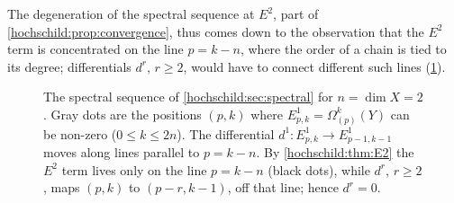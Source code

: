 The degeneration of the spectral sequence at $E^2$, part of
\cref{hochschild:prop:convergence}, thus comes down to the observation that
the $E^2$ term is concentrated on the line $p=k-n$, where the order of a
chain is tied to its degree; differentials $d^r$, $r\ge2$, would have to
connect different such lines (\cref{hochschild:fig:E2}).

\begin{figure}[htbp]
\centering
{}
\caption[The spectral sequence for the symbol algebra]{The spectral
sequence of \cref{hochschild:sec:spectral} for $n=\dim X=2$. Gray dots are
the positions $(p,k)$ where $E^1_{p,k}=\Omega^k_{(p)}(Y)$ can be non-zero
($0\le k\le2n$). The differential $d^1:E^1_{p,k}\to E^1_{p-1,k-1}$ moves
along lines parallel to $p=k-n$. By \cref{hochschild:thm:E2} the $E^2$ term
lives only on the line $p=k-n$ (black dots), while $d^r$, $r\ge2$, maps
$(p,k)$ to $(p-r,k-1)$, off that line; hence $d^r=0$.}
\label{hochschild:fig:E2}
\end{figure}


